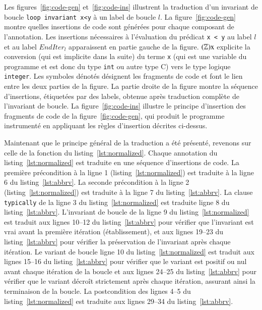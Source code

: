 



Les figures~\ref{fig:code-gen} et~\ref{fig:code-ins} illustrent la traduction
d'un invariant de boucle \lstinline'loop invariant x<y' à un label de boucle
$l$.
La figure~\ref{fig:code-gen} montre quelles insertions de code sont générées
pour chaque composant de l'annotation.
Les insertions nécessaires à l'évaluation du prédicat \lstinline'x < y' au
label $l$ et au label $\mathit{EndIter_l}$ apparaissent en partie gauche de la
figure.
$(\mathbb{Z})\mbox{\lstinline'x'}$ explicite la conversion (qui est implicite
dans la suite) du terme \lstinline'x' (qui est une variable du programme et est
donc du type \lstinline'int' ou autre type C) vers le type logique
\lstinline'integer'.
Les symboles dénotés 
désignent les fragments de code et font le lien entre les deux parties de la
figure.
La partie droite de la figure montre la séquence d'insertions, étiquetées par
des labels, obtenue après traduction complète de l'invariant de boucle.
La figure~\ref{fig:code-ins} illustre le principe d'insertion des fragments de
code de la figure~\ref{fig:code-gen}, qui produit le programme instrumenté en
appliquant les règles d'insertion décrites ci-dessus.


Maintenant que le principe général de la traduction a été présenté, revenons
sur celle de la fonction du listing~\ref{lst:normalized}.
Chaque annotation du listing~\ref{lst:normalized} est traduite en une séquence
d'insertions de code.
La première précondition à la ligne 1 (listing~\ref{lst:normalized}) est
traduite à la ligne 6 du listing~\ref{lst:abbrv}.
La seconde précondition à la ligne 2 (listing~\ref{lst:normalized}) est
traduite à la ligne 7 du listing~\ref{lst:abbrv}.
La clause \lstinline'typically' de la ligne 3 du listing~\ref{lst:normalized}
est traduite ligne 8 du listing~\ref{lst:abbrv}.
L'invariant de boucle de la ligne 9 du listing~\ref{lst:normalized} est traduit
aux lignes 10--12 du listing~\ref{lst:abbrv} pour vérifier que l'invariant est
vrai avant la première itération (établissement), et aux lignes 19--23 du
listing~\ref{lst:abbrv} pour vérifier la préservation de l'invariant après
chaque itération.
Le variant de boucle ligne 10 du listing~\ref{lst:normalized} est traduit aux
lignes 15--16 du listing~\ref{lst:abbrv} pour vérifier que le variant est
positif ou nul avant chaque itération de la boucle et aux lignes 24--25 du
listing~\ref{lst:abbrv} pour vérifier que le
variant décroît strictement après chaque itération, assurant ainsi la
terminaison de la boucle.
La postcondition des lignes 4--5 du listing~\ref{lst:normalized} est traduite
aux lignes 29--34 du listing~\ref{lst:abbrv}.

